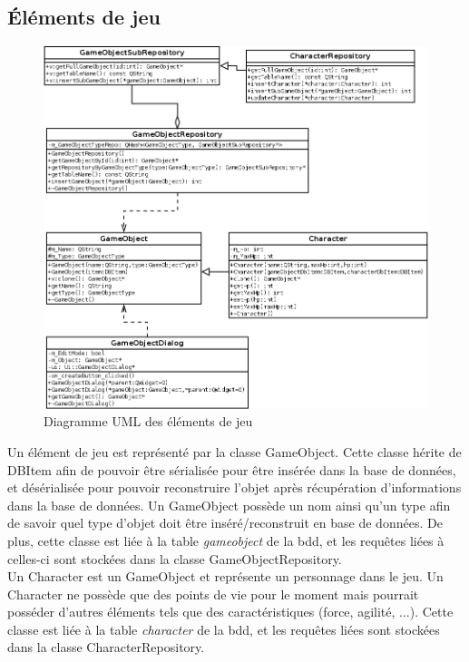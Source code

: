 \subsection{Éléments de jeu}

\begin{figure}[h!]
        \centering
        \includegraphics[width=\textwidth]{img/gameobject_uml.png}
        \caption{Diagramme UML des éléments de jeu}
\end{figure}

Un élément de jeu est représenté par la classe GameObject. Cette classe hérite de DBItem afin de pouvoir être sérialisée pour être insérée dans la base de données, et désérialisée pour pouvoir reconstruire l'objet après récupération d'informations dans la base de données. Un GameObject possède un nom ainsi qu'un type afin de savoir quel type d'objet doit être inséré/reconstruit en base de données. De plus, cette classe est liée à la table \emph{gameobject} de la bdd, et les requêtes liées à celles-ci sont stockées dans la classe GameObjectRepository.\\

Un Character est un GameObject et représente un personnage dans le jeu. Un Character ne possède que des points de vie pour le moment mais pourrait posséder d'autres éléments tels que des caractéristiques (force, agilité, ...). Cette classe est liée à la table \emph{character} de la bdd, et les requêtes liées sont stockées dans la classe CharacterRepository.\\

